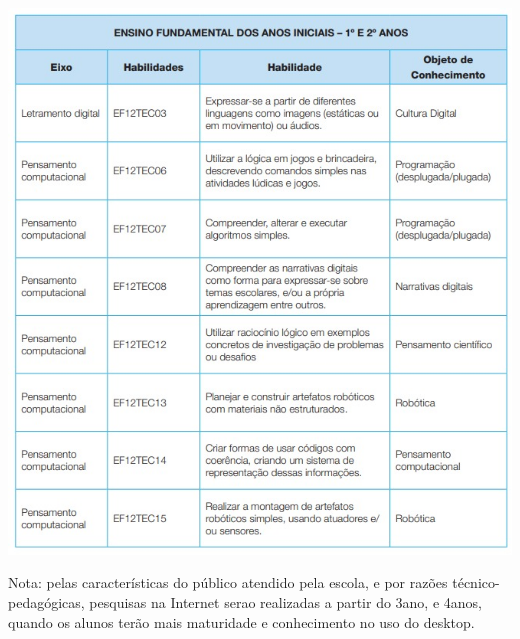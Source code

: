 \begin{center}
	\includegraphics[height=\textheight]{./IMG/ano-1-e-2.jpeg}
\end{center}

\pagebreak

%
\normalsize


Nota: pelas características do público atendido pela escola, e por razões técnico-pedagógicas, pesquisas na Internet serao realizadas a partir do 3\textordmasculine\space ano, e  4\textordmasculine\space anos,  quando os alunos terão mais maturidade e conhecimento no uso do desktop.


